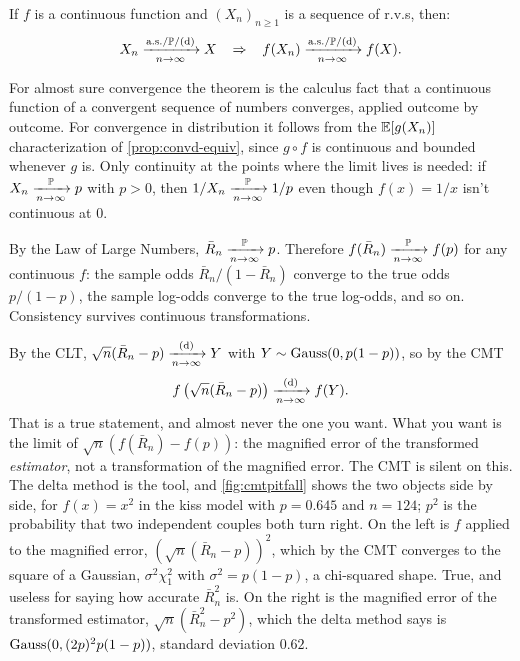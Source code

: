 \begin{theorem}
\label{thm:cmt}
If $f$ is a continuous function and $(X_n)_{n \geq 1}$ is a sequence of r.v.s, then:
\[
X_n \xrightarrow [n \to \infty ]{\text{a.s.}/\mathbb{P}/\text{(d)}} X \hspace{3mm}\Rightarrow \hspace{3mm} f(X_n) \xrightarrow [n \to \infty ]{\text{a.s.}/\mathbb{P}/\text{(d)}} f(X).
\]
\end{theorem}

For almost sure convergence the theorem is the calculus fact that a continuous function of a convergent sequence of numbers converges, applied outcome by outcome.
For convergence in distribution it follows from the $\operatorname*{\mathbb{E}}[g(X_n)]$ characterization of \cref{prop:convd-equiv}, since $g \circ f$ is continuous and bounded whenever $g$ is.
Only continuity at the points where the limit lives is needed: if $X_n \xrightarrow [n \to \infty ]{\mathbb{P}} p$ with $p > 0$, then $1/X_n \xrightarrow [n \to \infty ]{\mathbb{P}} 1/p$ even though $f(x) = 1/x$ isn't continuous at $0$.

\begin{example}
By the Law of Large Numbers, $\bar{R}_n \xrightarrow [n \to \infty ]{\mathbb{P}} p$.
Therefore $f(\bar{R}_n) \xrightarrow [n \to \infty ]{\mathbb{P}} f(p)$ for any continuous $f$: the sample odds $\bar{R}_n/(1 - \bar{R}_n)$ converge to the true odds $p/(1-p)$, the sample log-odds converge to the true log-odds, and so on.
Consistency survives continuous transformations.
\end{example}

\begin{pitfall}
By the CLT, $\sqrt{n}(\bar{R}_n - p) \xrightarrow [n \to \infty ]{\text{(d)}} Y$ with $Y \sim \text{Gauss}(0, p(1-p))$, so by the CMT
\[
f \left( \sqrt{n}(\bar{R}_n - p) \right) \xrightarrow [n \to \infty ]{\text{(d)}} f(Y).
\]
That is a true statement, and almost never the one you want.
What you want is the limit of $\sqrt{n} \left( f(\bar{R}_n) - f(p) \right)$: the magnified error of the transformed \textit{estimator}, not a transformation of the magnified error.
The CMT is silent on this.
The delta method is the tool, and \cref{fig:cmtpitfall} shows the two objects side by side, for $f(x) = x^2$ in the kiss model with $p = 0.645$ and $n = 124$; $p^2$ is the probability that two independent couples both turn right.
On the left is $f$ applied to the magnified error, $(\sqrt{n}(\bar{R}_n - p))^2$, which by the CMT converges to the square of a Gaussian, $\sigma^2 \chi^2_1$ with $\sigma^2 = p(1-p)$, a chi-squared shape.
True, and useless for saying how accurate $\bar{R}_n^2$ is.
On the right is the magnified error of the transformed estimator, $\sqrt{n}(\bar{R}_n^2 - p^2)$, which the delta method says is $\text{Gauss}(0, (2p)^2 p(1-p))$, standard deviation $0.62$.
\end{pitfall}

